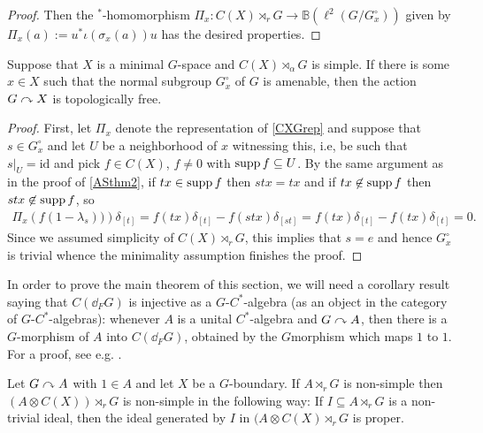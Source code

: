 \begin{proof}
Then the $^*$-homomorphism $\Pi_x \colon C(X) \rtimes_r G \to \mathbb{B}(\ell^2(G/G_x^\circ))$ given by $\Pi_x(a) := u^* \iota(\sigma_x(a)) u $ has the desired properties.
\end{proof}
\begin{proposition}
	Suppose that $X$ is a minimal $G$-space and $C(X) \rtimes_\alpha G$ is simple. If there is some $x \in X$ such that the normal subgroup $G_x^\circ$ of $G$ is amenable, then the action $G \stackrel{ }{\curvearrowright} X$ is topologically free. 
	\label{ozawa15pt2}
\end{proposition}
\begin{proof}
	First, let $\Pi_x$ denote the representation of \cref{CXGrep} and suppose that $s \in G_x^\circ$ and let $U$ be a neighborhood of $x$ witnessing this, i.e, be such that $s|_U = \mathrm{id}$ and pick $f \in C(X)$, $f \neq 0$ with $\operatorname{supp} f \subseteq U$. By the same argument as in the proof of \cref{ASthm2}, if $tx \in \operatorname{supp} f$ then $stx=tx$ and if $tx \not \in \operatorname{supp} f$ then $stx \not \in \operatorname{supp} f$, so
	\begin{align*}
		\Pi_x\left(f ( 1-\lambda_s)) \right) \delta_{[t]} = f(tx) \delta_{[t]} -f(stx) \delta_{[st]} = f(tx) \delta_{[t]} - f(tx)\delta_{[t]} = 0.
	\end{align*}
	Since we assumed simplicity of $C(X) \rtimes_r G$, this implies that $s = e$ and hence $G_x^\circ $ is trivial whence the minimality assumption finishes the proof.
\end{proof}
\begin{note}
	In order to prove the main theorem of this section, we will need a corollary result saying that $C(\dd _F G)$ is injective as a $G$-$C^*$-algebra (as an object in the category of $G$-$C^*$-algebras): whenever $A$ is a unital $C^*$-algebra and $G \stackrel{}{\curvearrowright} A$, then there is a $G$-morphism of $A$ into $C(\dd_F G)$, obtained by the $G$morphism which maps $1$ to $1$. For a proof, see e.g. \cite[Theorem 6 + Corollary 7]{ozawa2014lecture}.
\end{note}
\begin{proposition}
	Let $G \stackrel{}{\curvearrowright} A$ with $1 \in A$ and let $X$ be a $G$-boundary. If $A \rtimes_r G$ is non-simple then $(A \otimes C(X))\rtimes_r G$ is non-simple in the following way: If $I \subseteq A \rtimes_r G$ is a non-trivial ideal, then the ideal generated by $I$ in $(A \otimes C(X)\rtimes_r G$ is proper.
	\label{ozawprop17}
\end{proposition}
